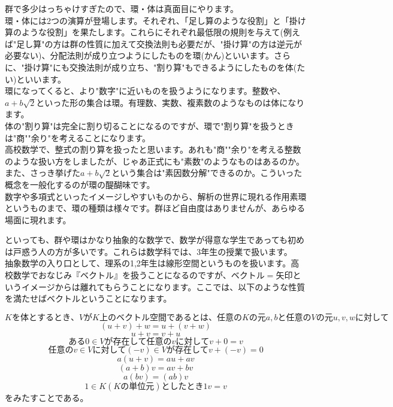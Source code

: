 群で多少はっちゃけすぎたので、環・体は真面目にやります。\\
環・体には2つの演算が登場します。それぞれ、「足し算のような役割」と「掛け算のような役割」を果たします。これらにそれぞれ最低限の規則を与えて(例えば"足し算"の方は群の性質に加えて交換法則も必要だが、"掛け算"の方は逆元が必要ない)、分配法則が成り立つようにしたものを環(かん)といいます。さらに、"掛け算"にも交換法則が成り立ち、"割り算"もできるようにしたものを体(たい)といいます。\\
環になってくると、より"数字"に近いものを扱うようになります。整数や、$a + b\sqrt{2}$といった形の集合は環。有理数、実数、複素数のようなものは体になります。\\


体の"割り算"は完全に割り切ることになるのですが、環で"割り算"を扱うときは"商""余り"を考えることになります。\\
高校数学で、整式の割り算を扱ったと思います。あれも"商""余り"を考える整数のような扱い方をしましたが、じゃあ正式にも"素数"のようなものはあるのか。また、さっき挙げた$a + b\sqrt{2}$という集合は"素因数分解"できるのか。こういった概念を一般化するのが環の醍醐味です。\\
数字や多項式といったイメージしやすいものから、解析の世界に現れる作用素環というものまで、環の種類は様々です。群ほど自由度はありませんが、あらゆる場面に現れます。

といっても、群や環はかなり抽象的な数学で、数学が得意な学生であっても初めは戸惑う人の方が多いです。これらは数学科では、3年生の授業で扱います。\\
抽象数学の入り口として、理系の1,2年生は線形空間というものを扱います。高校数学でおなじみ『ベクトル』を扱うことになるのですが、$ベクトル = 矢印$というイメージからは離れてもらうことになります。ここでは、以下のような性質を満たせばベクトルということになります。

\[
Kを体とするとき、VがK上のベクトル空間であるとは、任意のKの元a,bと任意のVの元u,v,wに対して
\]
\[
(u + v) + w = u + (v + w)
\]
\[
u + v = v + u
\]
\[
ある0 \in V が存在して任意のvに対して v + 0 = v
\]
\[
任意のv \in V に対して (-v) \in Vが存在して v + (-v) = 0
\]
\[
a(u + v) = au + av
\]
\[
(a + b)v = av + bv
\]
\[
a(bv) = (ab)v
\]
\[
1 \in K(Kの単位元)としたとき 1v = v
\]
をみたすことである。



